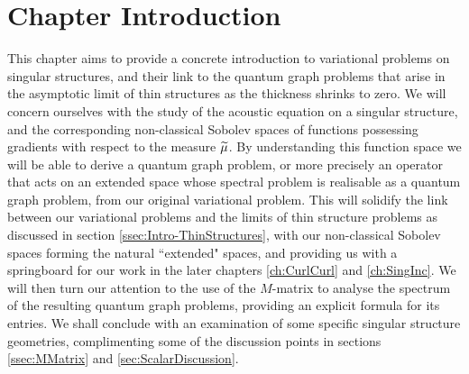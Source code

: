 \section{Chapter Introduction} \label{sec:ScalarEqnChapterIntro}
This chapter aims to provide a concrete introduction to variational problems on singular structures, and their link to the quantum graph problems that arise in the asymptotic limit of thin structures as the thickness shrinks to zero.
We will concern ourselves with the study of the acoustic equation on a singular structure, and the corresponding non-classical Sobolev spaces of functions possessing gradients with respect to the measure $\widetilde{\mu}$.
By understanding this function space we will be able to derive a quantum graph problem, or more precisely an operator that acts on an extended space whose spectral problem is realisable as a quantum graph problem, from our original variational problem.
This will solidify the link between our variational problems and the limits of thin structure problems as discussed in section \ref{ssec:Intro-ThinStructures}, with our non-classical Sobolev spaces forming the natural ``extended" spaces, and providing us with a springboard for our work in the later chapters \ref{ch:CurlCurl} and \ref{ch:SingInc}.
We will then turn our attention to the use of the $M$-matrix to analyse the spectrum of the resulting quantum graph problems, providing an explicit formula for its entries.
We shall conclude with an examination of some specific singular structure geometries, complimenting some of the discussion points in sections \ref{ssec:MMatrix} and \ref{sec:ScalarDiscussion}.

